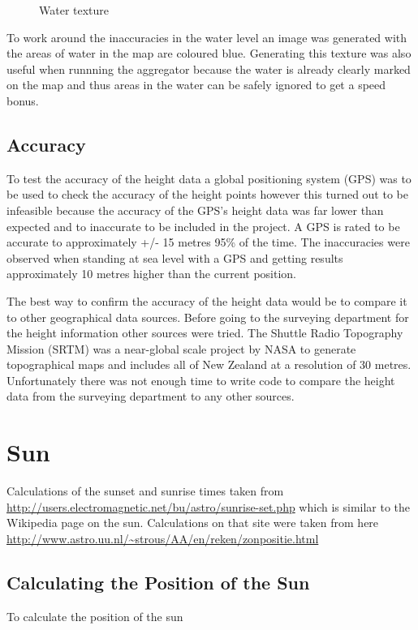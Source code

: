\documentclass[12pt]{report}
\begin{document}
\begin{figure}
\caption{Water texture}
\label{overlaytexture}
\end{figure}
To work around the inaccuracies in the water level an image was generated with the areas of water in the map are coloured blue. Generating this texture was also useful when runnning the aggregator because the water is already clearly marked on the map and thus areas in the water can be safely ignored to get a speed bonus. 

\subsection{Accuracy}
To test the accuracy of the height data a global positioning system (GPS) was to be used to check the accuracy of the height points however this turned out to be infeasible because the accuracy of the GPS's height data was far lower than expected and to inaccurate to be included in the project. A GPS is rated to be accurate to approximately +/- 15 metres 95\% of the time\cite{gpsaltitude}. The inaccuracies were observed when standing at sea level with a GPS and getting results approximately 10 metres higher than the current position.

The best way to confirm the accuracy of the height data would be to compare it to other geographical data sources. Before going to the surveying department for the height information other sources were tried. The Shuttle Radio Topography Mission (SRTM)\cite{srtm} was a near-global scale project by NASA to generate topographical maps and includes all of New Zealand at a resolution of 30 metres. Unfortunately there was not enough time to write code to compare the height data from the surveying department to any other sources.

\section{Sun}


Calculations of the sunset and sunrise times taken from \url{http://users.electromagnetic.net/bu/astro/sunrise-set.php} which is similar to the Wikipedia page on the sun. Calculations on that site were taken from here \url{http://www.astro.uu.nl/~strous/AA/en/reken/zonpositie.html}
\subsection{Calculating the Position of the Sun}
To calculate the position of the sun 
\end{document}

